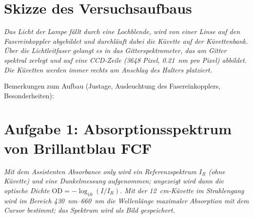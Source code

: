 \documentclass{article}
\newcommand{\bl}[1][2cm]{\underline{\hspace{#1}}}
\newcommand{\was}[1]{\begingroup\small\itshape #1\par\endgroup\vspace{0.15cm}}
\begin{document}
\newpage

\section{Skizze des Versuchsaufbaus}

\was{Das Licht der Lampe f\"allt durch eine Lochblende, wird von einer Linse auf den
Fasereinkoppler abgebildet und durchl\"auft dabei die K\"uvette auf der
K\"uvettenbank. \"Uber die Lichtleitfaser gelangt es in das Gitterspektrometer, das
am Gitter spektral zerlegt und auf eine CCD-Zeile (3648 Pixel, \SI{0,21}{nm} pro
Pixel) abbildet. Die K\"uvetten werden immer \emph{rechts am Anschlag} des
Halters platziert.}

\vspace{0.2cm}
\noindent\framebox[\textwidth]{\rule{0pt}{8.5cm}}

\vspace{0.4cm}

\noindent Bemerkungen zum Aufbau (Justage, Ausleuchtung des Fasereinkopplers,
Besonderheiten):

\vspace{0.2cm}
\noindent \bl[15cm]

\vspace{0.7cm}
\noindent \bl[15cm]

\vspace{0.7cm}
\noindent \bl[15cm]

\newpage

\section{Aufgabe 1: Absorptionsspektrum von Brillantblau FCF}

\was{Mit dem Assistenten \emph{Absorbance only} wird ein Referenzspektrum $I_R$
(ohne K\"uvette) und eine Dunkelmessung aufgenommen; angezeigt wird dann die
optische Dichte $\mathrm{OD} = -\log_{10}(I/I_R)$. Mit der \SI{12}{cm}-K\"uvette
im Strahlengang wird im Bereich \SIrange{430}{660}{nm} die Wellenl\"ange
maximaler Absorption mit dem Cursor bestimmt; das Spektrum wird als Bild
gespeichert.}
\end{document}
